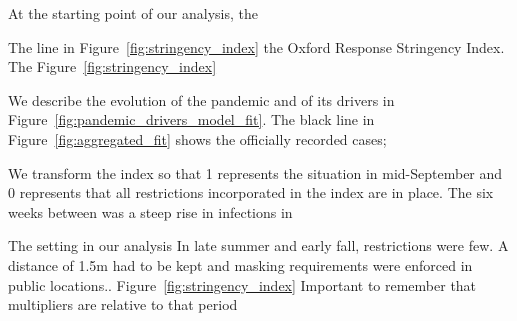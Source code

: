 At the starting point of our analysis, the 

The  line in Figure~\ref{fig:stringency_index} the Oxford Response Stringency Index\cite{Hale2020}. The Figure~\ref{fig:stringency_index}


We describe the evolution of the pandemic and of its drivers in Figure~\ref{fig:pandemic_drivers_model_fit}. The black line in Figure~\ref{fig:aggregated_fit} shows the officially recorded cases; 

We transform the index so that 1 represents the situation in mid-September and 0 represents that all restrictions incorporated in the index are in place. The six weeks between  was a steep rise in infections in 

The setting in our analysis 
In late summer and early fall, restrictions were few. A distance of 1.5m had to be kept and masking requirements were enforced in public locations.. 
 Figure~\ref{fig:stringency_index} Important to remember that multipliers are relative to that period

